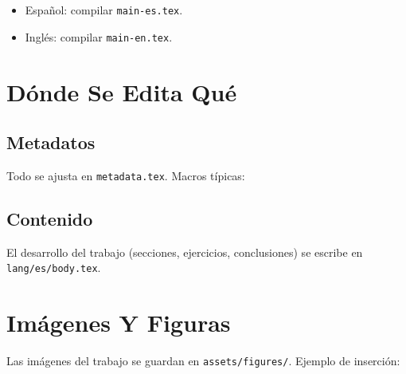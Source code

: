 \begin{itemize}
  \item Español: compilar \texttt{main-es.tex}.
  \item Inglés: compilar \texttt{main-en.tex}.
\end{itemize}

\vspace{2mm}


\section{Dónde Se Edita Qué}
\vspace{2mm}

\subsection{Metadatos}
\vspace{2mm}

Todo se ajusta en \texttt{metadata.tex}. Macros típicas:

\vspace{2mm}


\subsection{Contenido}
\vspace{2mm}

El desarrollo del trabajo (secciones, ejercicios, conclusiones) se escribe en \texttt{lang/es/body.tex}.


\section{Imágenes Y Figuras}
\vspace{2mm}

Las imágenes del trabajo se guardan en \texttt{assets/figures/}. Ejemplo de inserción:

